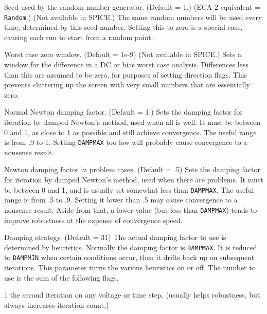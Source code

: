 \begin{description}
\item[{\tt SEED} = {\it x}] Seed used by the random number
generator.  (Default = 1.)  (ECA-2 equivalent = {\tt Random}.)
(Not available in SPICE.)  The same random numbers will be used
every time, determined by this seed number.  Setting this to
zero is a special case, causing each run to start from a random
point.

\item[{\tt WCZERO} = {\it x}] Worst case zero window.  (Default
= 1e-9) (Not available in SPICE.)  Sets a window for the
difference in a DC or bias worst case analysis.  Differences
less than this are assumed to be zero, for purposes of setting
direction flags.  This prevents cluttering up the screen with
very small numbers that are essentially zero.
	
\item[{\tt DAMPMAX} = {\it x}] Normal Newton damping factor.
(Default = 1.)  Sets the damping factor for iteration by damped
Newton's method, used when all is well.  It must be between 0 and 1,
as close to 1 as possible and still achieve convergence.  The useful
range is from .9 to 1.  Setting {\tt DAMPMAX} too low will probably cause
convergence to a nonsense result.

\item[{\tt DAMPMIN} = {\it x}] Newton damping factor in problem
cases.  (Default = .5)  Sets the damping factor for iteration by
damped Newton's method, used when there are problems.  It must be
between 0 and 1, and is usually set somewhat less than {\tt DAMPMAX}.
The useful range is from .5 to .9.  Setting it lower than .5 may
cause convergence to a nonsense result.  Aside from that, a lower
value (but less than {\tt DAMPMAX}) tends to improve robustness at
the expense of convergence speed.

\item[{\tt DAMPSTrategy} = {\it x}] Damping strategy.  (Default =
31)  The actual damping factor to use is determined by heuristics.
Normally the damping factor is {\tt DAMPMAX}.  It is reduced to
{\tt DAMPMIN} when certain conditions occur, then it drifts back
up on subsequent iterations.  This parameter turns the various
heuristics on or off.  The number to use is the sum of the following
flags.

\begin{description}

\item{1} the second iteration on any voltage or time step.  (usually
helps robustness, but always increases iteration count.)


\end{description}
\end{description}
